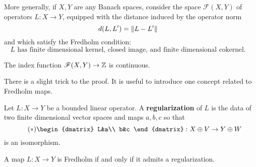  More generally, if $X,Y$ are any Banach spaces, consider the space
 $\mathscr{F}(X,Y)$ of operators $L:X\to Y$, equipped with the distance
 induced by the operator norm
 \begin{equation*}
   d(L,L')=\left\lVert L-L'\right\rVert
 \end{equation*}
 and which satisfy the Fredholm condition:
 \begin{equation*}
   L\text{ has finite dimensional kernel, closed image, and finite dimensional cokernel}.
 \end{equation*}
 \begin{thm}
   The index function $\mathscr{F}(X,Y)\to \mathbb{Z}$ is continuous. 
 \end{thm}
 There is a slight trick to the proof. It is useful to introduce one
 concept related to Fredholm maps.
 \begin{defn}
   Let $L:X\to Y$ be a bounded linear operator. A
   \textbf{regularization} of $L$ is the data of two finite
   dimensional vector spaces and maps $a,b,c$ so that
   \begin{equation*}\tag{$\ast$}
    \begin{dmatrix}
       L&a\\
       b&c
     \end{dmatrix}:X\oplus V\to Y\oplus W
   \end{equation*}
   is an isomorphism.
 \end{defn}
 \begin{prop}
   A map $L:X\to Y$ is Fredholm if and only if it admits a regularization.
 \end{prop}
